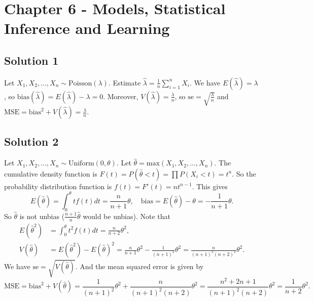 \section*{Chapter 6 - Models, Statistical Inference and Learning}

\subsection*{Solution 1}

Let $X_1, X_2, ..., X_n \sim \mathrm{Poisson}(\lambda)$.
Estimate $\hat{\lambda} = \frac{1}{n} \sum_{i = 1}^n X_i$.
We have $E(\hat{\lambda}) = \lambda$, so $\mathrm{bias}(\hat{\lambda}) = E(\hat{\lambda}) - \lambda = 0$.
Moreover, $V(\hat{\lambda}) = \frac{\lambda}{n}$, so $\mathrm{se} = \sqrt{\frac{\lambda}{n}}$ and $\mathrm{MSE} = \mathrm{bias}^2 + V(\hat{\lambda}) = \frac{\lambda}{n}$.


\subsection*{Solution 2}

Let $X_1, X_2, ..., X_n \sim \mathrm{Uniform}(0, \theta)$.
Let $\hat{\theta} = \mathrm{max}(X_1, X_2, ..., X_n)$.
The cumulative density function is $F(t) = P(\hat{\theta} < t) = \prod P(X_i < t) = t^n$.
So the probability distribution function is $f(t) = F'(t) = nt^{n-1}$.
This gives
\begin{equation*}
    E(\hat{\theta}) = \int_0^{\theta} tf(t) dt = \frac{n}{n+1} \theta, \quad
    \mathrm{bias} = E(\hat{\theta}) - \theta = - \frac{1}{n+1} \theta.
\end{equation*}
So $\hat{\theta}$ is not unbias ($\frac{n+1}{n} \hat{\theta}$ would be unbias).
Note that
\begin{equation*}
    \begin{split}
        E(\hat{\theta}^2) &= \int_0^{\theta} t^2 f(t) dt
            = \frac{n}{n+2} \theta^2, \\
        V(\hat{\theta}) &= E(\hat{\theta}^2) - E(\hat{\theta})^2
            = \frac{n}{n+1} \theta^2 - \frac{1}{(n+1)^2} \theta^2
            = \frac{n}{(n+1)^2 (n+2)^2} \theta^2.
    \end{split}
\end{equation*}
We have $\mathrm{se} = \sqrt{V(\hat{\theta})}$.
And the mean squared error is given by
\begin{equation*}
    \mathrm{MSE} = \mathrm{bias}^2 + V(\hat{\theta})
        = \frac{1}{(n+1)^2} \theta^2 + \frac{n}{(n+1)^2 (n+2)} \theta^2
        = \frac{n^2 + 2n + 1}{(n+1)^2 (n+2)} \theta^2
        = \frac{1}{n + 2} \theta^2.
\end{equation*}
